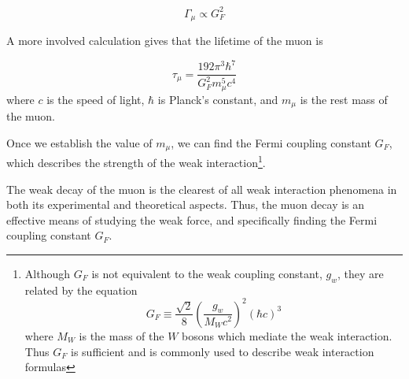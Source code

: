 \begin{equation}\Gamma_{\mu} \propto G_F^2 \end{equation}

A more involved calculation \cite[p.~310-314]{griffths} gives that the
lifetime of the muon is

\begin{equation}\tau_{\mu} = \dfrac{192\pi^3\hbar^7}{G_F^2m_{\mu}^5c^4}\end{equation}
where $c$ is the speed of light, $\hbar$ is Planck's constant, and
$m_{\mu}$ is the rest mass of the muon. 

Once we establish the value of $m_{\mu}$, we can find the Fermi
coupling constant $G_F$, which describes the strength of the weak
interaction\footnote{Although $G_F$ is not equivalent to the weak
coupling constant, $g_w$, they are related by the equation
\[G_F\equiv \frac{\sqrt{2}}{8}\left(\frac{g_w}{M_Wc^2}\right)^2(\hbar c)^3\]
where $M_W$ is the mass of the $W$ bosons which mediate the weak
interaction. Thus $G_F$ is sufficient and is commonly used to describe
weak interaction formulas\cite[p.~313]{griffiths}}.

The weak decay of the muon is the clearest of all weak interaction
phenomena in both its experimental and theoretical aspects. Thus, the
muon decay is an effective means of studying the weak force, and
specifically finding the Fermi coupling constant $G_F$.
